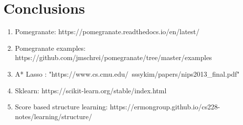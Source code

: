 \documentclass{article} %
\begin{document}
\section{Conclusions}
\begin{enumerate} 

\item Pomegranate: https://pomegranate.readthedocs.io/en/latest/

\item Pomegranate examples: https://github.com/jmschrei/pomegranate/tree/master/examples
 
\item A* Lasso : "https://www.cs.cmu.edu/~sssykim/papers/nips2013\_final.pdf"
 
\item Sklearn: https://scikit-learn.org/stable/index.html
 
\item Score based structure learning: https://ermongroup.github.io/cs228-notes/learning/structure/




\end{enumerate} 
\end{document}
